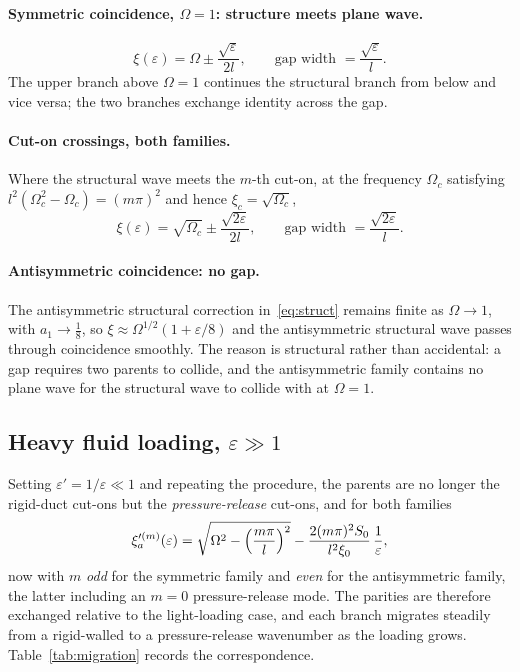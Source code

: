 \documentclass[11pt,a4paper]{article}
\newcommand{\Om}{\Omega}
\newcommand{\eps}{\varepsilon}
\theoremstyle{plain}
\theoremstyle{remark}
\begin{document}
\paragraph{Symmetric coincidence, $\Om=1$: structure meets plane wave.}
\begin{equation}
\xi(\eps)=\Om\pm\frac{\sqrt\eps}{2l},\qquad\text{gap width }=\frac{\sqrt\eps}{l}.
\label{eq:gapcoinc}
\end{equation}
The upper branch above $\Om=1$ continues the structural branch from below and vice versa; the two
branches exchange identity across the gap.

\paragraph{Cut-on crossings, both families.} Where the structural wave meets the $m$-th cut-on, at the
frequency $\Om_c$ satisfying $l^2(\Om_c^2-\Om_c)=(m\pi)^2$ and hence $\xi_c=\sqrt{\Om_c}$,
\begin{equation}
\xi(\eps)=\sqrt{\Om_c}\pm\frac{\sqrt{2\eps}}{2l},\qquad\text{gap width }=\frac{\sqrt{2\eps}}{l}.
\label{eq:gapcuton}
\end{equation}

\paragraph{Antisymmetric coincidence: no gap.} The antisymmetric structural correction
in~\eqref{eq:struct} remains finite as $\Om\to1$, with $a_1\to\tfrac18$, so
$\xi\approx\Om^{1/2}(1+\eps/8)$ and the antisymmetric structural wave passes through coincidence
smoothly. The reason is structural rather than accidental: a gap requires two parents to collide, and
the antisymmetric family contains no plane wave for the structural wave to collide with at $\Om=1$.

\subsection{Heavy fluid loading, $\eps\gg1$}
Setting $\eps'=1/\eps\ll1$ and repeating the procedure, the parents are no longer the rigid-duct
cut-ons but the \emph{pressure-release} cut-ons, and for both families
\begin{equation}
\xi'^{(m)}_a(\eps)=\sqrt{\Om^2-\Bigl(\frac{m\pi}{l}\Bigr)^2}-\frac{2(m\pi)^2S_0}{l^2\xi_0}\,\frac1\eps,
\label{eq:heavy}
\end{equation}
now with $m$ \emph{odd} for the symmetric family and \emph{even} for the antisymmetric family, the
latter including an $m=0$ pressure-release mode. The parities are therefore exchanged relative to the
light-loading case, and each branch migrates steadily from a rigid-walled to a pressure-release
wavenumber as the loading grows. Table~\ref{tab:migration} records the correspondence.
\end{document}
